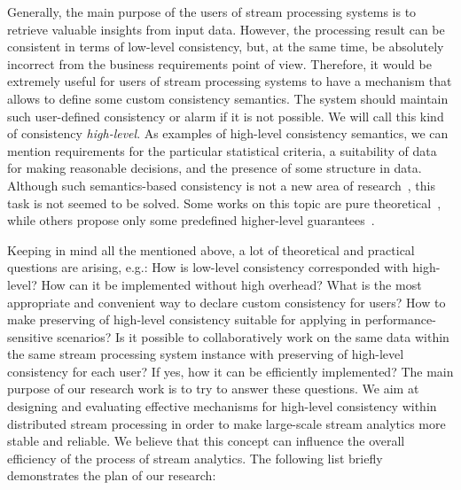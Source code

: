 Generally, the main purpose of the users of stream processing systems is to retrieve valuable insights from input data. However, the processing result can be consistent in terms of low-level consistency, but, at the same time, be absolutely incorrect from the business requirements point of view. Therefore, it would be extremely useful for users of stream processing systems to have a mechanism that allows to define some custom consistency semantics. The system should maintain such user-defined consistency or alarm if it is not possible. We will call this kind of consistency {\em high-level}. As examples of high-level consistency semantics, we can mention requirements for the particular statistical criteria, a suitability of data for making reasonable decisions, and the presence of some structure in data. Although such semantics-based consistency is not a new area of research~\cite{Garcia-Molina:1983:USK:319983.319985}, this task is not seemed to be solved. Some works on this topic are pure theoretical~\cite{Rodriguez:2008:ITA:1463434.1463480, Guo:2010:CMS:1822018.1822052}, while others propose only some predefined higher-level guarantees~\cite{Mihaila:2008:AIO:1458082.1458132, Fischer:2010:SSP:1739041.1739068}.

Keeping in mind all the mentioned above, a lot of theoretical and practical questions are arising, e.g.: How is low-level consistency corresponded with high-level? How can it be implemented without high overhead? What is the most appropriate and convenient way to declare custom consistency for users? How to make preserving of high-level consistency suitable for applying in performance-sensitive scenarios? Is it possible to collaboratively work on the same data within the same stream processing system instance with preserving of high-level consistency for each user? If yes, how it can be efficiently implemented? The main purpose of our research work is to try to answer these questions. We aim at designing and evaluating effective mechanisms for high-level consistency within distributed stream processing in order to make large-scale stream analytics more stable and reliable. We believe that this concept can influence the overall efficiency of the process of stream analytics. The following list briefly demonstrates the plan of our research:

